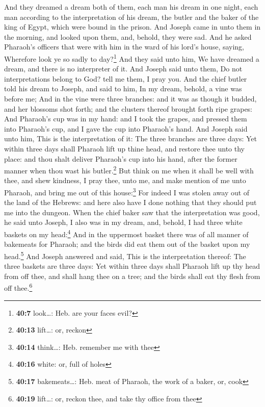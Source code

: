  And they dreamed a dream both of them, each man his dream
in one night, each man according to the interpretation of his dream, the
butler and the baker of the king of Egypt, which were bound in the
prison.  And Joseph came in unto them in the morning, and
looked upon them, and, behold, they were sad.  And he
asked Pharaoh's officers that were with him in the ward of his lord's
house, saying, Wherefore look ye so sadly to day?\footnote{\textbf{40:7}
  look\ldots: Heb. are your faces evil?}  And they said
unto him, We have dreamed a dream, and there is no interpreter of it.
And Joseph said unto them, Do not interpretations belong to God? tell me
them, I pray you.  And the chief butler told his dream to
Joseph, and said to him, In my dream, behold, a vine was before me;
 And in the vine were three branches: and it was as
though it budded, and her blossoms shot forth; and the clusters thereof
brought forth ripe grapes:  And Pharaoh's cup was in my
hand: and I took the grapes, and pressed them into Pharaoh's cup, and I
gave the cup into Pharaoh's hand.  And Joseph said unto
him, This is the interpretation of it: The three branches are three
days:  Yet within three days shall Pharaoh lift up thine
head, and restore thee unto thy place: and thou shalt deliver Pharaoh's
cup into his hand, after the former manner when thou wast his
butler.\footnote{\textbf{40:13} lift\ldots: or, reckon} 
But think on me when it shall be well with thee, and shew kindness, I
pray thee, unto me, and make mention of me unto Pharaoh, and bring me
out of this house:\footnote{\textbf{40:14} think\ldots: Heb. remember me
  with thee}  For indeed I was stolen away out of the
land of the Hebrews: and here also have I done nothing that they should
put me into the dungeon.  When the chief baker saw that
the interpretation was good, he said unto Joseph, I also was in my
dream, and, behold, I had three white baskets on my head:\footnote{\textbf{40:16}
  white: or, full of holes}  And in the uppermost basket
there was of all manner of bakemeats for Pharaoh; and the birds did eat
them out of the basket upon my head.\footnote{\textbf{40:17}
  bakemeats\ldots: Heb. meat of Pharaoh, the work of a baker, or, cook}
 And Joseph answered and said, This is the interpretation
thereof: The three baskets are three days:  Yet within
three days shall Pharaoh lift up thy head from off thee, and shall hang
thee on a tree; and the birds shall eat thy flesh from off
thee.\footnote{\textbf{40:19} lift\ldots: or, reckon thee, and take thy
  office from thee}

